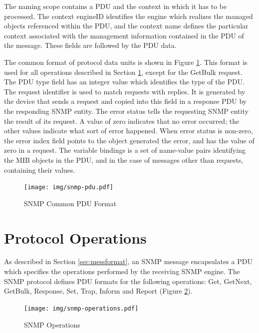 The naming scope contains a PDU and the context in which it has to be processed. The context engineID identifies the engine which realizes the managed objects referenced within the PDU, and the context name defines the particular context associated with the management information contained in the PDU of the message. These fields are followed by the PDU data.

The common format of protocol data units is shown in Figure \ref{fig:snmp-pdu}. This format is used for all operations described in Section \ref{sec:opetations}, except for the GetBulk request. The PDU type field has an integer value which identifies the type of the PDU. The request identifier is used to match requests with replies. It is generated by the device that sends a request and copied into this field in a response PDU by the responding SNMP entity. The error status tells the requesting SNMP entity the result of its request. A value of zero indicates that no error occurred; the other values indicate what sort of error happened. When error status is non-zero, the error index field points to the object generated the error, and has the value of zero in a request. The variable bindings is a set of name-value pairs identifying the MIB objects in the PDU, and in the case of messages other than requests, containing their values.
\begin{figure}[htp]	
\begin{center}
    \texttt{[image: img/snmp-pdu.pdf]}
    \caption{SNMP Common PDU Format}   
	\label{fig:snmp-pdu}
\end{center}
\end{figure}


\section{Protocol Operations}\label{sec:opetations}
As described in Section \ref{sec:messformat}, an SNMP message encapsulates a PDU which specifies the operations performed by the receiving SNMP engine. The SNMP protocol defines PDU formats for the following operations: Get, GetNext, GetBulk, Response, Set, Trap, Inform and Report (Figure \ref{fig:snmp-operations}). 

\begin{figure}[htp]	
\begin{center}
	\label{fig:snmp-operations}
    \texttt{[image: img/snmp-operations.pdf]}
    \caption{SNMP Operations}   
\end{center}
\end{figure}


